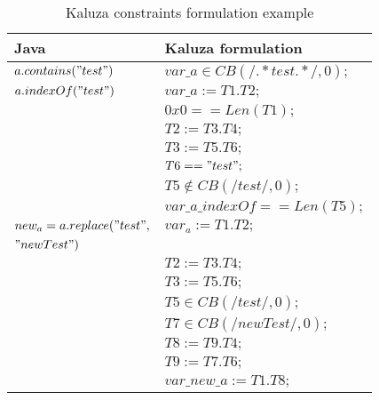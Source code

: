 \begin{table}[t]
   \centering
    \begin{tabular}{|l|l|}
      \hline
      \textbf{Java} & \textbf{Kaluza formulation}\\
      \hline
      $a.contains("test")$ & $var\_a \in CB(/.*test.*/, 0);$ \\
      \hline
      $a.indexOf("test")$ & $var\_a := T1 . T2;$ \\
                  & $0x0 == Len(T1);$ \\
                  & $T2 := T3 . T4;$ \\
                  & $T3 := T5 . T6;$ \\
                  & $T6 == "test";$ \\
                  & $T5 \notin CB(/test/, 0);$ \\
              & $var\_a\_indexOf == Len(T5);$ \\
      \hline
      $new_a = a.replace("test",$ & $var_a := T1 . T2;$ \\
       $"newTest")$ &  \\
                      & $T2 := T3 . T4;$ \\
                      & $T3 := T5 . T6;$ \\
                      & $T5 \in CB(/test/, 0);$ \\
                      & $T7 \in CB(/newTest/, 0);$ \\
                      & $T8 :=  T9 . T4;$ \\
                      & $T9 :=  T7 . T6;$ \\
                      & $var\_new\_a := T1 . T8;$ \\
      \hline
    \end{tabular}
    \caption{Kaluza constraints formulation example}
    \label{table:tabkaluza}
  \end{table}

